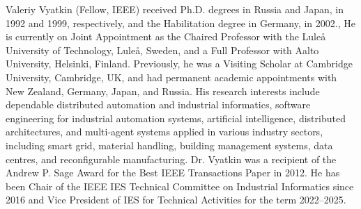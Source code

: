 \documentclass{ieeeojies}
\begin{document}
\begin{IEEEbiography}{Valeriy Vyatkin} (Fellow, IEEE) received Ph.D. degrees in Russia and Japan, in 1992 and 1999, respectively, and the Habilitation degree in Germany, in 2002., He is currently on Joint Appointment as the Chaired Professor with the Luleå University of Technology, Luleå, Sweden, and a Full Professor with Aalto University, Helsinki, Finland. Previously, he was a Visiting Scholar at Cambridge University, Cambridge, UK, and had permanent academic appointments with New Zealand, Germany, Japan, and Russia. His research interests include dependable distributed automation and industrial informatics, software engineering for industrial automation systems, artificial intelligence, distributed architectures, and multi-agent systems applied in various industry sectors, including smart grid, material handling, building management systems, data centres, and reconfigurable manufacturing. Dr. Vyatkin was a recipient of the Andrew P. Sage Award for the Best IEEE Transactions Paper in 2012. He has been Chair of the IEEE IES Technical Committee on Industrial Informatics since 2016 and Vice President of IES for Technical Activities for the term 2022–2025.
\end{IEEEbiography}

\EOD
\end{document}

